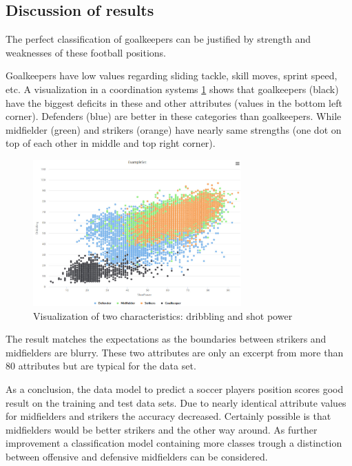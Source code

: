 \subsection{Discussion of results}
\label{sec:DiscussionResults}
The perfect classification of goalkeepers can be justified by strength and weaknesses of these football positions.

 Goalkeepers have low values regarding sliding tackle, skill moves, sprint speed, etc. A visualization in a coordination systems \ref{fig:VisualAttributes} shows that goalkeepers (black) have the biggest deficits in these and other attributes (values in the bottom left corner). Defenders (blue) are better in these categories than goalkeepers. While midfielder (green) and strikers (orange) have nearly same strengths (one dot on top of each other in middle and top right corner). 

\begin{figure}
\centering
  \includegraphics[width=8cm]{VisualizationAttributes.jpg}
  \caption{Visualization of two characteristics: dribbling and shot power}
  \label{fig:VisualAttributes}
\end{figure}

The result matches the expectations as the boundaries between strikers and midfielders are blurry. These two attributes are only an excerpt from more than 80 attributes but are typical for the data set.

As a conclusion, the data model to predict a soccer players position scores good result on the training and test data sets. Due to nearly identical attribute values for midfielders and strikers the accuracy decreased. Certainly possible is that midfielders would be better strikers and the other way around. 
As further improvement a classification model containing more classes trough a distinction between offensive and defensive midfielders can be considered. 